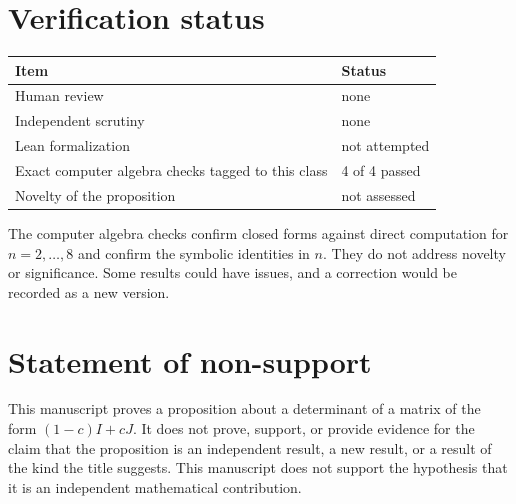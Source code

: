 \documentclass[11pt]{article}
\begin{document}
\section{Verification status}
\begin{center}
\small
\begin{tabular}{ll}
\toprule
Item & Status \\
\midrule
Human review & none \\
Independent scrutiny & none \\
Lean formalization & not attempted \\
Exact computer algebra checks tagged to this class & 4 of 4 passed \\
Novelty of the proposition & not assessed \\
\bottomrule
\end{tabular}
\end{center}
The computer algebra checks confirm closed forms against direct computation for $n=2,\dots,8$ and confirm the symbolic identities in $n$. They do not address novelty or significance. Some results could have issues, and a correction would be recorded as a new version.

\section{Statement of non-support}
This manuscript proves a proposition about a determinant of a matrix of the form $(1-c)I+cJ$. It does not prove, support, or provide evidence for the claim that the proposition is an independent result, a new result, or a result of the kind the title suggests. This manuscript does not support the hypothesis that it is an independent mathematical contribution.


\end{document}

